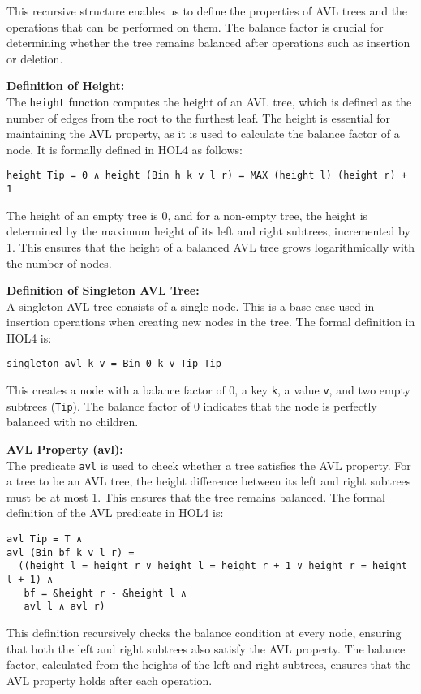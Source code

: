 \documentclass[12pt]{article}
\begin{document}
This recursive structure enables us to define the properties of AVL trees and the operations that can be performed on them. The balance factor is crucial for determining whether the tree remains balanced after operations such as insertion or deletion.

\textbf{Definition of Height:} \\
The \texttt{height} function computes the height of an AVL tree, which is defined as the number of edges from the root to the furthest leaf. The height is essential for maintaining the AVL property, as it is used to calculate the balance factor of a node. It is formally defined in HOL4 as follows:
\begin{verbatim}
height Tip = 0 ∧ height (Bin h k v l r) = MAX (height l) (height r) + 1
\end{verbatim}

The height of an empty tree is 0, and for a non-empty tree, the height is determined by the maximum height of its left and right subtrees, incremented by 1. This ensures that the height of a balanced AVL tree grows logarithmically with the number of nodes.

\textbf{Definition of Singleton AVL Tree:} \\
A singleton AVL tree consists of a single node. This is a base case used in insertion operations when creating new nodes in the tree. The formal definition in HOL4 is:
\begin{verbatim}
singleton_avl k v = Bin 0 k v Tip Tip
\end{verbatim}
This creates a node with a balance factor of 0, a key \texttt{k}, a value \texttt{v}, and two empty subtrees (\texttt{Tip}). The balance factor of 0 indicates that the node is perfectly balanced with no children.

\textbf{AVL Property (avl):} \\
The predicate \texttt{avl} is used to check whether a tree satisfies the AVL property. For a tree to be an AVL tree, the height difference between its left and right subtrees must be at most 1. This ensures that the tree remains balanced. The formal definition of the AVL predicate in HOL4 is:
\begin{verbatim}
avl Tip = T ∧
avl (Bin bf k v l r) =
  ((height l = height r ∨ height l = height r + 1 ∨ height r = height l + 1) ∧
   bf = &height r - &height l ∧
   avl l ∧ avl r)
\end{verbatim}
This definition recursively checks the balance condition at every node, ensuring that both the left and right subtrees also satisfy the AVL property. The balance factor, calculated from the heights of the left and right subtrees, ensures that the AVL property holds after each operation.
\end{document}
